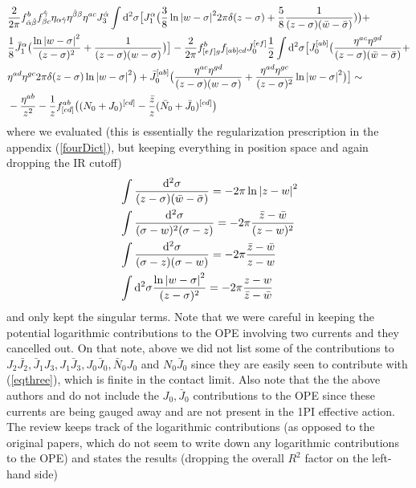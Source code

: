 \documentclass[12pt]{article}
\numberwithin{equation}{section}
\newcommand{\h}[1]{\hat{#1}}
\begin{document}
{\begin{align}
		    &\frac{2}{2\pi} f^{b}_{\h{\alpha}\h{\beta}} f^{\h{\gamma}}_{\beta c} \eta_{\alpha \h{\gamma}} \eta^{\h{\beta}\beta} \eta^{ac} J_3^{\h{\alpha}} \int \dd^2\sigma\big[J_1^\alpha\big(\frac{3}{8}\ln\abs{w-\sigma}^2 2\pi \delta(z-\sigma) + \frac{5}{8} \frac{1}{(z-\sigma)(\bar{w}-\bar{\sigma})})\big) + \nonumber \\
		    &\frac{1}{8} \bar{J}_1^\alpha \big(\frac{\ln \abs{w-\sigma}^2}{(z-\sigma)^2} + \frac{1}{(z-\sigma)(w-\sigma)}\big)\big] - \frac{2}{2\pi} f^b_{[ef] g} f_{[ab] cd} J_0^{[ef]} \frac{1}{2} \int \dd^2\sigma\big[J_0^{[ab]} \big(\frac{\eta^{ac} \eta^{gd}}{(z-\sigma)(\bar{w}-\bar{\sigma})} +\nonumber\\& \eta^{a d}\eta^{gc}2\pi \delta(z-\sigma)\ln\abs{w-\sigma}^2\big) + \bar{J}_0^{[ab]} \big(\frac{\eta^{ac} \eta^{gd}}{(z-\sigma)(w-\sigma)} + \frac{\eta^{ad}\eta^{gc}}{(z-\sigma)^2}\ln\abs{w-\sigma}^2\big)\big] \sim
		  \nonumber \\& -\frac{\eta^{ab}}{z^2} - \frac{1}{z}f^{ab}_{[cd]}\big((N_0 + J_0)^{[cd]} - \frac{\bar{z}}{z} (\bar{N}_0 + \bar{J}_0)^{[cd]}\big)
\end{align}
}
where we evaluated (this is essentially the regularization prescription in the appendix (\ref{fourDict}), but keeping everything in position space and again dropping the IR cutoff)
\begin{align}
&\int \frac{\dd^2 \sigma}{(z-\sigma)(\bar{w}-\bar{\sigma})} = -2\pi \ln \abs{z-w}^2 \\
&\int \frac{\dd^2 \sigma}{(\sigma-w)^2 (\sigma-z)} = -2\pi \frac{\bar{z}-\bar{w}}{(z-w)^2} \\
\label{eqthree}
&\int \frac{\dd^2 \sigma}{(\sigma -z)(\sigma-w)} = -2\pi \frac{\bar{z}-\bar{w}}{z-w} \\
& \int \dd^2\sigma \frac{\ln \abs{w-\sigma}^2}{(z-\sigma)^2} = -2\pi \frac{z-w}{\bar{z}-\bar{w}}
\end{align}
and only kept the singular terms.
Note that we were careful in keeping the potential logarithmic contributions to the OPE involving two currents and they cancelled out. On that note, above we did not list some of the contributions to $J_2 \bar{J_2}, \bar{J}_1 J_3, J_1 \bar{J}_3, J_0 \bar{J}_0, \bar{N}_0 J_0$ and $N_0 \bar{J}_0$ since they are easily seen to contribute with (\ref{eqthree}), which is finite in the contact limit. Also note that the the above authors and \cite{Mazzucato:2009fv} do not include the $J_0, \bar{J}_0$ contributions to the OPE since these currents are being gauged away and are not present in the 1PI effective action.
The review \cite{Mazzucato:2009fv} keeps track of the logarithmic contributions (as opposed to the original papers, which do not seem to write down any logarithmic contributions to the OPE) and states the results (dropping the overall $R^2$ factor on the left-hand side)
\end{document}
